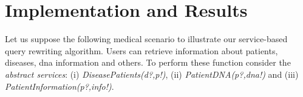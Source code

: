 \section{Implementation and Results}
\label{sec:implementationandresults}  
Let us suppose the following medical scenario to illustrate our service-based query rewriting algorithm. Users can retrieve information about patients, diseases, dna information and others.
To perform these function consider the \textit{abstract services}: (i)
\textit{DiseasePatients(d?,p!)}, (ii) \textit{PatientDNA(p?,dna!)} and (iii)
\textit{PatientInformation(p?,info!)}.
% 


